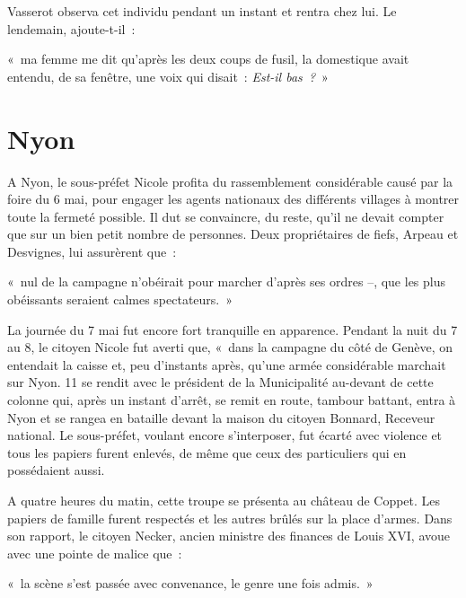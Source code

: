 \documentclass[french,twoside]{book} %
\newenvironment{quoteblock}%
  {\begin{quoting}}
  {\end{quoting}}
\newenvironment{quotebar}{%
    \def\FrameCommand{{\color{rubric!10!}\vrule width 0.5em} \hspace{0.9em}}%
    \def\OuterFrameSep{\itemsep} %
    \MakeFramed {\advance\hsize-\width \FrameRestore}
  }%
  {%
    \endMakeFramed
  }
\renewenvironment{quoteblock}%
  {%
    \savenotes
    \setstretch{0.9}
    \normalfont
    \begin{quotebar}
  }
  {%
    \end{quotebar}
    \spewnotes
  }
\begin{document}
\noindent Vasserot observa cet individu pendant un instant et rentra chez lui. Le lendemain, ajoute-t-il :\par

\begin{quoteblock}
\noindent « ma femme me dit qu’après les deux coups de fusil, la domestique avait entendu, de sa fenêtre, une voix qui disait : \emph{Est-il bas ?} »\end{quoteblock}

\section[{Nyon}]{Nyon}
\noindent A Nyon, le sous-préfet Nicole profita du rassemblement considérable causé par la foire du 6 mai, pour engager les agents nationaux des différents villages à montrer toute la fermeté possible. Il dut se convaincre, du reste, qu’il ne devait compter que sur un bien petit nombre de personnes. Deux propriétaires de fiefs, Arpeau et Desvignes, lui assurèrent que :\par

\begin{quoteblock}
\noindent « nul de la campagne n’obéirait pour marcher d’après ses ordres –, que les plus obéissants seraient calmes spectateurs. »\end{quoteblock}

\noindent La journée du 7 mai fut encore fort tranquille en apparence. Pendant la nuit du 7 au 8, le citoyen Nicole fut averti que, « dans la campagne du côté de Genève, on entendait la caisse et, peu d’instants après, qu’une armée considérable marchait sur Nyon. 11 se rendit avec le président de la Municipalité au-devant de cette colonne qui, après un instant d’arrêt, se remit en route, tambour battant, entra à Nyon et se rangea en bataille devant la maison du citoyen Bonnard, Receveur national. Le sous-préfet, voulant encore s’interposer, fut écarté avec violence et tous les papiers furent enlevés, de même que ceux des particuliers qui en possédaient aussi.\par
A quatre heures du matin, cette troupe se présenta au château de Coppet. Les papiers de famille furent respectés et les autres brûlés sur la place d’armes. Dans son rapport, le citoyen Necker, ancien ministre des finances de Louis XVI, avoue avec une pointe de malice que :\par

\begin{quoteblock}
\noindent « la scène s’est passée avec convenance, le genre une fois admis. »\end{quoteblock}
\end{document}
